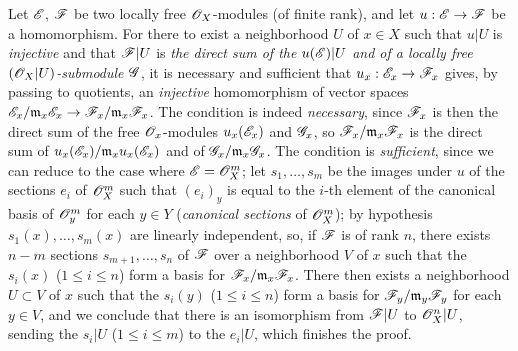 \begin{env}[5.5.5]
\label{0.5.5.5}
Let $\mathscr{E}$, $\mathscr{F}$ be two locally free $\mathscr{O}_X$-modules (of finite rank), and let
$u:\mathscr{E}\to\mathscr{F}$ be a homomorphism. For there to exist a neighborhood $U$ of $x\in X$ such
that $u|U$ is {\em injective} and that $\mathscr{F}|U$ is {\em the direct sum of the
$u(\mathscr{E})|U$ and of a locally free $(\mathscr{O}_X|U)$-submodule $\mathscr{G}$}, it is necessary and
sufficient that $u_x:\mathscr{E}_x\to\mathscr{F}_x$ gives, by passing to quotients, an {\em injective}
homomorphism of vector spaces
$\mathscr{E}_x/\mathfrak{m}_x\mathscr{E}_x\to\mathscr{F}_x/\mathfrak{m}_x\mathscr{F}_x$. The condition is indeed
{\em necessary}, since $\mathscr{F}_x$ is then the direct sum of the free $\mathscr{O}_x$-modules
$u_x(\mathscr{E}_x)$ and $\mathscr{G}_x$, so $\mathscr{F}_x/\mathfrak{m}_x\mathscr{F}_x$ is the direct sum of
$u_x(\mathscr{E}_x)/\mathfrak{m}_x u_x(\mathscr{E}_x)$ and of $\mathscr{G}_x/\mathfrak{m}_x\mathscr{G}_x$. The
condition is {\em sufficient}, since we can reduce to the case where $\mathscr{E}=\mathscr{O}_X^m$; let
$s_1,\dots,s_m$ be the images under $u$ of the sections $e_i$ of $\mathscr{O}_X^m$ such that
$(e_i)_y$ is equal to the $i$-th element of the canonical basis of $\mathscr{O}_y^m$ for each
$y\in Y$ ({\em canonical sections} of $\mathscr{O}_X^m$); by hypothesis $s_1(x),\dots,s_m(x)$ are
linearly independent, so, if $\mathscr{F}$ is of rank $n$, there exists $n-m$ sections
$s_{m+1},\dots,s_n$ of $\mathscr{F}$ over a neighborhood $V$ of $x$ such that the $s_i(x)$
($1\leqslant i\leqslant n$) form a basis for $\mathscr{F}_x/\mathfrak{m}_x\mathscr{F}_x$. There then
exists  a neighborhood $U\subset V$ of $x$ such that the $s_i(y)$
($1\leqslant i\leqslant n$) form a basis for $\mathscr{F}_y/\mathfrak{m}_y\mathscr{F}_y$ for each
$y\in V$, and we conclude  that there is an isomorphism from $\mathscr{F}|U$ to
$\mathscr{O}_X^n|U$, sending the $s_i|U$ ($1\leqslant i\leqslant m$) to the $e_i|U$, which finishes
the proof.
\end{env}
